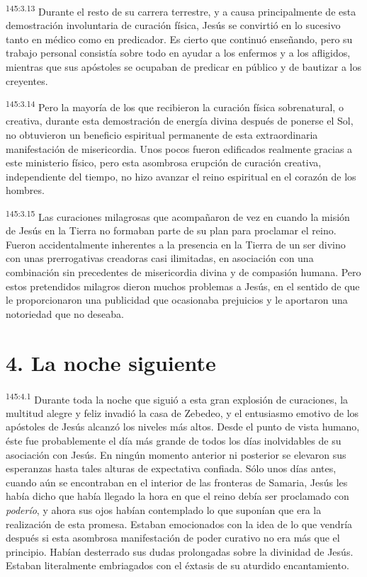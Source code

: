 \par
\textsuperscript{145:3.13} Durante el resto de su carrera terrestre, y a causa principalmente de esta demostración involuntaria de curación física, Jesús se convirtió en lo sucesivo tanto en médico como en predicador. Es cierto que continuó enseñando, pero su trabajo personal consistía sobre todo en ayudar a los enfermos y a los afligidos, mientras que sus apóstoles se ocupaban de predicar en público y de bautizar a los creyentes.

\par
\textsuperscript{145:3.14} Pero la mayoría de los que recibieron la curación física sobrenatural, o creativa, durante esta demostración de energía divina después de ponerse el Sol, no obtuvieron un beneficio espiritual permanente de esta extraordinaria manifestación de misericordia. Unos pocos fueron edificados realmente gracias a este ministerio físico, pero esta asombrosa erupción de curación creativa, independiente del tiempo, no hizo avanzar el reino espiritual en el corazón de los hombres.

\par
\textsuperscript{145:3.15} Las curaciones milagrosas que acompañaron de vez en cuando la misión de Jesús en la Tierra no formaban parte de su plan para proclamar el reino. Fueron accidentalmente inherentes a la presencia en la Tierra de un ser divino con unas prerrogativas creadoras casi ilimitadas, en asociación con una combinación sin precedentes de misericordia divina y de compasión humana. Pero estos pretendidos milagros dieron muchos problemas a Jesús, en el sentido de que le proporcionaron una publicidad que ocasionaba prejuicios y le aportaron una notoriedad que no deseaba.

\section*{4. La noche siguiente}
\par
\textsuperscript{145:4.1} Durante toda la noche que siguió a esta gran explosión de curaciones, la multitud alegre y feliz invadió la casa de Zebedeo, y el entusiasmo emotivo de los apóstoles de Jesús alcanzó los niveles más altos. Desde el punto de vista humano, éste fue probablemente el día más grande de todos los días inolvidables de su asociación con Jesús. En ningún momento anterior ni posterior se elevaron sus esperanzas hasta tales alturas de expectativa confiada. Sólo unos días antes, cuando aún se encontraban en el interior de las fronteras de Samaria, Jesús les había dicho que había llegado la hora en que el reino debía ser proclamado con \textit{poderío}, y ahora sus ojos habían contemplado lo que suponían que era la realización de esta promesa. Estaban emocionados con la idea de lo que vendría después si esta asombrosa manifestación de poder curativo no era más que el principio. Habían desterrado sus dudas prolongadas sobre la divinidad de Jesús. Estaban literalmente embriagados con el éxtasis de su aturdido encantamiento.

